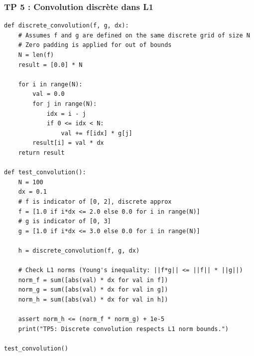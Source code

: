 \documentclass[11pt,a4paper]{article}
\begin{document}
\subsubsection*{TP 5 : Convolution discrète dans L1}
\begin{lstlisting}
def discrete_convolution(f, g, dx):
    # Assumes f and g are defined on the same discrete grid of size N
    # Zero padding is applied for out of bounds
    N = len(f)
    result = [0.0] * N

    for i in range(N):
        val = 0.0
        for j in range(N):
            idx = i - j
            if 0 <= idx < N:
                val += f[idx] * g[j]
        result[i] = val * dx
    return result

def test_convolution():
    N = 100
    dx = 0.1
    # f is indicator of [0, 2], discrete approx
    f = [1.0 if i*dx <= 2.0 else 0.0 for i in range(N)]
    # g is indicator of [0, 3]
    g = [1.0 if i*dx <= 3.0 else 0.0 for i in range(N)]

    h = discrete_convolution(f, g, dx)

    # Check L1 norms (Young's inequality: ||f*g|| <= ||f|| * ||g||)
    norm_f = sum([abs(val) * dx for val in f])
    norm_g = sum([abs(val) * dx for val in g])
    norm_h = sum([abs(val) * dx for val in h])

    assert norm_h <= (norm_f * norm_g) + 1e-5
    print("TP5: Discrete convolution respects L1 norm bounds.")

test_convolution()
\end{lstlisting}
\end{document}
